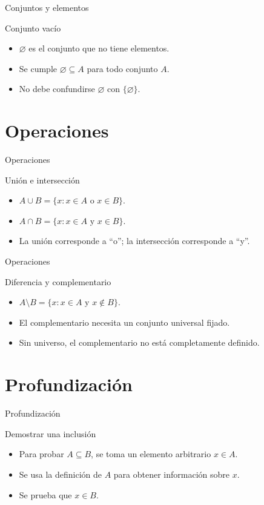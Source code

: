 \documentclass[aspectratio=169,11pt]{beamer}
\begin{document}
\begin{frame}{Conjuntos y elementos}
\begin{block}{Conjunto vacío}
\begin{itemize}
  \item \(\varnothing\) es el conjunto que no tiene elementos.
  \item Se cumple \(\varnothing\subseteq A\) para todo conjunto \(A\).
  \item No debe confundirse \(\varnothing\) con \(\{\varnothing\}\).
\end{itemize}
\end{block}
\end{frame}

\section{Operaciones}

\begin{frame}{Operaciones}
\begin{block}{Unión e intersección}
\begin{itemize}
  \item \(A\cup B=\{x:x\in A\text{ o }x\in B\}\).
  \item \(A\cap B=\{x:x\in A\text{ y }x\in B\}\).
  \item La unión corresponde a ``o''; la intersección corresponde a ``y''.
\end{itemize}
\end{block}
\end{frame}

\begin{frame}{Operaciones}
\begin{block}{Diferencia y complementario}
\begin{itemize}
  \item \(A\setminus B=\{x:x\in A\text{ y }x\notin B\}\).
  \item El complementario necesita un conjunto universal fijado.
  \item Sin universo, el complementario no está completamente definido.
\end{itemize}
\end{block}
\end{frame}

\section{Profundización}

\begin{frame}{Profundización}
\begin{block}{Demostrar una inclusión}
\begin{itemize}
  \item Para probar \(A\subseteq B\), se toma un elemento arbitrario \(x\in A\).
  \item Se usa la definición de \(A\) para obtener información sobre \(x\).
  \item Se prueba que \(x\in B\).
\end{itemize}
\end{block}
\end{frame}
\end{document}
